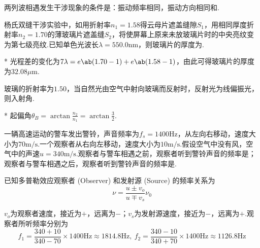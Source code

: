 \begin{problem}[波的干涉]
    两列波相遇发生干涉现象的条件是：振动频率相同，振动方向相同和.
\end{problem}

\begin{problem}[双缝干涉]
    杨氏双缝干涉实验中，如用折射率$n_1=1.58$得云母片遮盖缝隙$S_1$，用相同厚度折射率$n_2=1.70$的薄玻璃片遮盖缝$S_2$，将使屏幕上原来未放玻璃片时的中央亮纹变为第七级亮纹.已知单色光波长$\lambda=550.0\mathrm{nm}$，则玻璃片的厚度为.
\end{problem}
\begin{solution}*
    光程差的变化为$7\lambda=e\ab(1.70-1)+e\ab(1.58-1)$，由此可得玻璃片的厚度为$32.08\mu\mathrm{m}$.
\end{solution}

\begin{problem}[起偏角]
    玻璃的折射率为$1.50$，当自然光由空气中射向玻璃而反射时，反射光为线偏振光，则入射角.
\end{problem}
\begin{solution}*
    起偏角$\theta_B=\arctan{\frac{n_2}{n_1}}=\arctan{\frac{3}{2}}$.
\end{solution}

\begin{problem}[多普勒效应]
    一辆高速运动的警车发出警铃，声音频率为$f_s=1400\mathrm{Hz}$，从左向右移动，速度大小为$70\mathrm{m/s}$.一个观察者从右向左移动，速度大小为$10\mathrm{m/s}$.假设空气中没有风，空气中的声速$u=340\mathrm{m/s}$.观察者与警车相遇之前，观察者听到警铃声音的频率是；观察者与警车相遇之后，观察者听到警铃声音的频率是.
\end{problem}
\begin{solution}
    已知多普勒效应观察者 (Observer) 和发射源 (Source) 的频率关系为
    \[\nu=\frac{u\pm v_o}{u\mp v_s}\nu_0\]

    $v_o$为观察者速度，接近为$+$，远离为$-$；$v_s$为发射源速度，接近为$-$，远离为$+$.观察者所听频率分别为
    \[f_1=\frac{340+10}{340-70}\times 1400\mathrm{Hz}\approx 1814.8\mathrm{Hz},\ f_2=\frac{340-10}{340+70}\times 1400\mathrm{Hz}\approx 1126.8\mathrm{Hz}\]
\end{solution}

